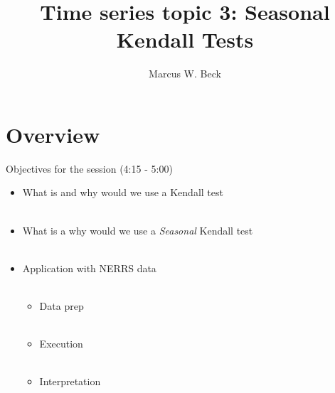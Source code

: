 \documentclass[xcolor=dvipsnames,serif]{beamer}\usepackage[]{graphicx}\usepackage[]{color}
\begin{document}
\title[Seasonal Kendall]{Time series topic 3: Seasonal Kendall Tests}

\author[M. Beck]{Marcus W. Beck}

\date{}









\section{Overview}

\begin{frame}{Objectives for the session (4:15 - 5:00)}{}
\begin{itemize}
\item What is and why would we use a Kendall test \\~\\
\item What is a why would we use a \textit{Seasonal} Kendall test \\~\\
\item Application with NERRS data \\~\\
\begin{itemize}
\item Data prep \\~\\
\item Execution \\~\\
\item Interpretation
\end{itemize}
\end{itemize}
\end{frame}
\end{document}
